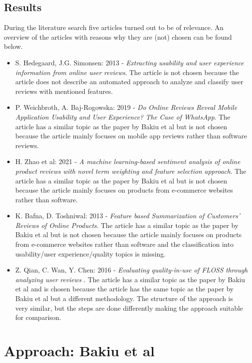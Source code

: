 \subsection*{Results}
During the literature search five articles turned out to be of relevance. An overview of the articles with reasons why they are (not) chosen can be found below.

\begin{itemize}
    \item S. Hedegaard, J.G. Simonsen: 2013 - \textit{Extracting usability and user experience information from online user reviews}. The article is not chosen because the article does not describe an automated approach to analyze and classify user reviews with mentioned features.
    \item P. Weichbroth, A. Baj-Rogowska: 2019 - \textit{Do Online Reviews Reveal Mobile Application Usability and User Experience? The Case of WhatsApp}. \cite{Weichbroth2019} The article has a similar topic as the paper by Bakiu et al but is not chosen because the article mainly focuses on mobile app reviews rather than software reviews.
    \item H. Zhao et al: 2021 - \textit{A machine learning-based sentiment analysis of online product reviews with novel term weighting and feature selection approach}. \cite{Zhao2021} The article has a similar topic as the paper by Bakiu et al but is not chosen because the article mainly focuses on products from e-commerce websites rather than software.
    \item K. Bafna, D. Toshniwal: 2013 - \textit{Feature based Summarization of Customers' Reviews of Online Products}. \cite{Bafna2013} The article has a similar topic as the paper by Bakiu et al but is not chosen because the article mainly focuses on products from e-commerce websites rather than software and the classification into usability/user experience/quality topics is missing.
    \item Z. Qian, C. Wan, Y. Chen: 2016 - \textit{Evaluating quality-in-use of FLOSS through analyzing user reviews} \cite{Qian2016}. The article has a similar topic as the paper by Bakiu et al and is chosen because the article has the same topic as the paper by Bakiu et al but a different methodology. The structure of the approach is very similar, but the steps are done differently making the approach suitable for comparison.
\end{itemize}

\section{Approach: Bakiu et al}
